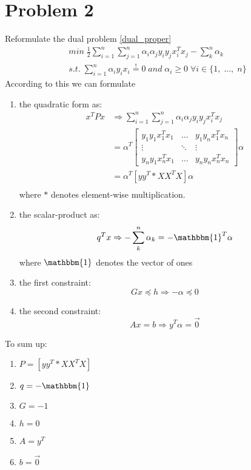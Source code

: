 \documentclass[12pt]{article}
\newcommand{\kersum}[1]{\sum_{#1 = 1}^{n}  \alpha_{#1} y_{#1} x_{#1}}
\newcommand{\dksum}[2]{\sum_{#1=1}^{n}  \sum_{#2=1}^{n}  
                                              \alpha_{#1}\alpha_{#2}
                                              y_{#1} y_{#2} 
                                              x_{#1}^{T} x_{#2}}
\newcommand{\matcell}[2]{y_{#1} y_{#2} x_{#1}^T x_{#2}}
\begin{document}
\section*{Problem 2}
Reformulate the dual problem \eqref{dual_proper}
\begin{equation}
\begin{split}
min\; \frac{1}{2} \dksum{i}{j} - \sum_k^n \alpha_k \\
s.t. \;  \kersum{i} \stackrel{!}{=} 0\; and \; \alpha_i \geq 0 \; \forall i \in \{1,\; ...,\; n\}
\end{split}
\end{equation}
\newpage
According to this we can formulate 
\begin{enumerate}
\item{the quadratic form as:}
\begin{equation}
\begin{split}
x^T P x 
& \Rightarrow \dksum{i}{j} \\ 
&= \alpha^T  
    \begin{bmatrix}
        \matcell{1}{1} & \dots       & \matcell{1}{n} \\
        \vdots               & \ddots     & \vdots \\
        \matcell{n}{1} & \dots       & \matcell{n}{n}
\end{bmatrix} \alpha \\
&= \alpha^T \left[yy^T * XX^T X\right] \alpha \\
\end{split}
\end{equation}
where $*$ denotes element-wise multiplication.
\item{the scalar-product as:}
\begin{equation}
q^T x \Rightarrow - \sum_k^n \alpha_k = - \mathbbm{1}^T \alpha
\end{equation}
 where $\mathbbm{1}$ denotes the vector of ones 
\item{the first constraint:}
\begin{equation}
Gx \preceq h \Rightarrow - \alpha \preceq 0
\end{equation}
\item{the second constraint:}
\begin{equation}
Ax = b \Rightarrow y^T \alpha = \vec{0}
\end{equation}
\end{enumerate}

To sum up:
\begin{enumerate}
\item{$P = \left[yy^T * XX^T X\right]$}
\item{$q = - \mathbbm{1}$}
\item{$G = -1$}
\item{$h = 0$}
\item{$A = y^T$}
\item{$b = \vec{0}$}
\end{enumerate}
\end{document}
